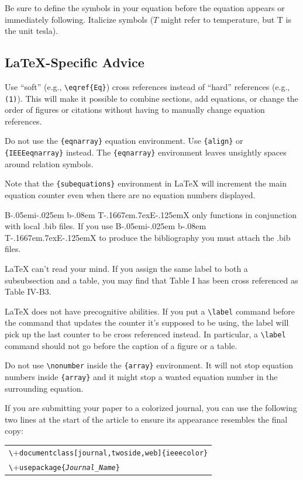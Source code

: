 \documentclass[journal,twoside,web]{ieeecolor}
\def\BibTeX{{\rm B\kern-.05em{\sc i\kern-.025em b}\kern-.08em
    T\kern-.1667em\lower.7ex\hbox{E}\kern-.125emX}}
\begin{document}
Be sure to define the symbols in your equation before the equation appears or
immediately following. Italicize symbols ($T$ might refer
to temperature, but T is the unit tesla).

\subsection{\LaTeX-Specific Advice}

Use ``soft'' (e.g., \verb|\eqref{Eq}|) cross references instead
of ``hard'' references (e.g., \verb|(1)|). This will make it possible
to combine sections, add equations, or change the order of figures or
citations without having to manually change equation references.

Do not use the \verb|{eqnarray}| equation environment. Use
\verb|{align}| or \verb|{IEEEeqnarray}| instead. The \verb|{eqnarray}|
environment leaves unsightly spaces around relation symbols.

Note that the \verb|{subequations}| environment in {\LaTeX}
will increment the main equation counter even when there are no
equation numbers displayed.

    {\BibTeX} only functions in conjunction with local .bib files. If you use {\BibTeX} to produce the
bibliography you must attach the .bib files.

    {\LaTeX} can't read your mind. If you assign the same label to both a
subsubsection and a table, you may find that Table I has been cross
referenced as Table IV-B3.

{\LaTeX} does not have precognitive abilities. If you put a
\verb|\label| command before the command that updates the counter it's
supposed to be using, the label will pick up the last counter to be
cross referenced instead. In particular, a \verb|\label| command
should not go before the caption of a figure or a table.

Do not use \verb|\nonumber| inside the \verb|{array}| environment. It
will not stop equation numbers inside \verb|{array}| and it might stop a
wanted equation number in the surrounding equation.

If you are submitting your paper to a colorized journal, you can use
the following two lines at the start of the article to ensure its
appearance resembles the final copy:

\smallskip\noindent
\begin{small}
    \begin{tabular}{l}
        \verb+\+\texttt{documentclass[journal,twoside,web]\{ieeecolor\}} \\
        \verb+\+\texttt{usepackage\{\textit{Journal\_Name}\}}
    \end{tabular}
\end{small}
\end{document}
